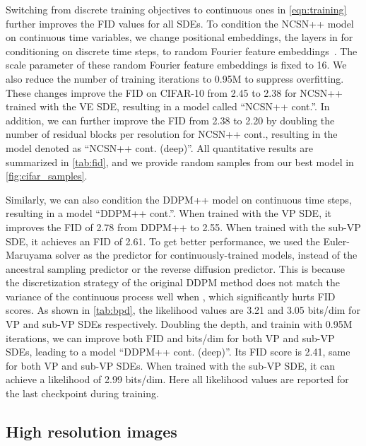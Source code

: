 \documentclass{article} \usepackage{iclr2021_conference,times}
\begin{document}
Switching from discrete training objectives to continuous ones in \cref{eqn:training} further improves the FID values for all SDEs. To condition the NCSN++ model on continuous time variables, we change positional embeddings, the layers in \citet{ho2020denoising} for conditioning on discrete time steps, to random Fourier feature embeddings~\citep{tancik2020fourfeat}. The scale parameter of these random Fourier feature embeddings is fixed to 16. We also reduce the number of training iterations to 0.95M to suppress overfitting. These changes improve the FID on CIFAR-10 from 2.45 to 2.38 for NCSN++ trained with the VE SDE, resulting in a model called ``NCSN++ cont.''. In addition, we can further improve the FID from 2.38 to 2.20 by doubling the number of residual blocks per resolution for NCSN++ cont., resulting in the model denoted as ``NCSN++ cont. (deep)''. All quantitative results are summarized in \cref{tab:fid}, and we provide random samples from our best model in \cref{fig:cifar_samples}. 

Similarly, we can also condition the DDPM++ model on continuous time steps, resulting in a model ``DDPM++ cont.''. When trained with the VP SDE, it improves the FID of 2.78 from DDPM++ to 2.55. When trained with the sub-VP SDE, it achieves an FID of 2.61. To get better performance, we used the Euler-Maruyama solver as the predictor for continuously-trained models, instead of the ancestral sampling predictor or the reverse diffusion predictor. This is because the discretization strategy of the original DDPM method does not match the variance of the continuous process well when , which significantly hurts FID scores. As shown in \cref{tab:bpd}, the likelihood values are 3.21 and 3.05 bits/dim for VP and sub-VP SDEs respectively. Doubling the depth, and trainin with 0.95M iterations, we can improve both FID and bits/dim for both VP and sub-VP SDEs, leading to a model ``DDPM++ cont. (deep)''. Its FID score is 2.41, same for both VP and sub-VP SDEs. When trained with the sub-VP SDE, it can achieve a likelihood of 2.99 bits/dim. Here all likelihood values are reported for the last checkpoint during training.



\subsection{High resolution images} 
\label{app:hq}
\end{document}
